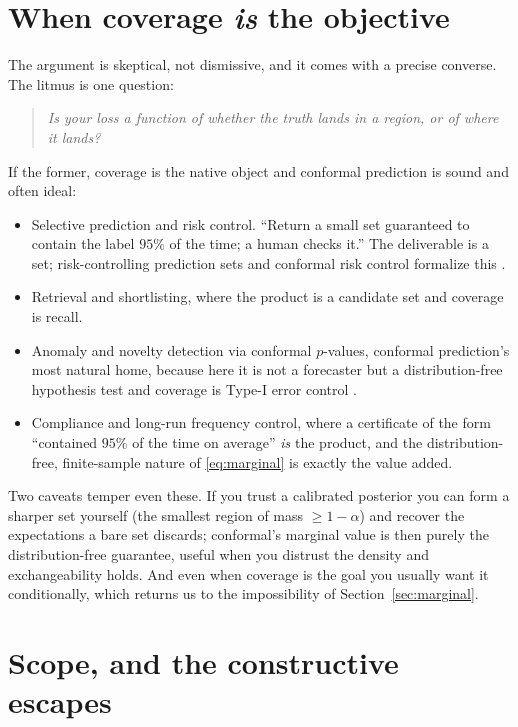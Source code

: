 \documentclass[10pt]{article} %
\theoremstyle{definition}
\begin{document}
\section{When coverage \emph{is} the objective}\label{sec:steel}

The argument is skeptical, not dismissive, and it comes with a precise converse. The
litmus is one question:
\begin{quote}
\emph{Is your loss a function of \emph{whether} the truth lands in a region, or of
\emph{where} it lands?}
\end{quote}
If the former, coverage is the native object and conformal prediction is sound and often
ideal:
\begin{itemize}
  \item Selective prediction and risk control. ``Return a small set guaranteed
  to contain the label $95\%$ of the time; a human checks it.'' The deliverable is a set;
  risk-controlling prediction sets and conformal risk control formalize this
  \citep{angelopoulos2021uncertainty, bates2021distribution, angelopoulos2024conformalrisk}.
  \item Retrieval and shortlisting, where the product is a candidate set and
  coverage is recall.
  \item Anomaly and novelty detection via conformal $p$-values, conformal
  prediction's most natural home, because here it is not a forecaster but a
  distribution-free hypothesis test and coverage is Type-I error control
  \citep{vovk2005algorithmic}.
  \item Compliance and long-run frequency control, where a certificate of the
  form ``contained $95\%$ of the time on average'' \emph{is} the product, and the
  distribution-free, finite-sample nature of \eqref{eq:marginal} is exactly the value
  added.
\end{itemize}
Two caveats temper even these. If you trust a calibrated posterior you can form a
sharper set yourself (the smallest region of mass $\ge 1-\alpha$) and recover the
expectations a bare set discards; conformal's marginal value is then purely the
distribution-free guarantee, useful when you distrust the density and exchangeability
holds. And even when coverage is the goal you usually want it conditionally, which
returns us to the impossibility of Section~\ref{sec:marginal}.

\section{Scope, and the constructive escapes}\label{sec:scope}
\end{document}
